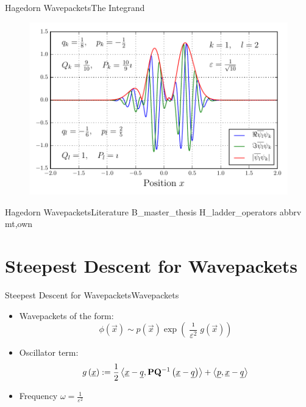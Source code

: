 \documentclass{beamer}
\begin{document}
\begin{frame}{Hagedorn Wavepackets}{The Integrand}
  \begin{figure}
    \centering
    \includegraphics[width=0.8\linewidth]{./fig/overlap_integrand.pdf}
  \end{figure}
\end{frame}


\begin{frame}{Hagedorn Wavepackets}{Literature}
  \nocite{hawp}{B_master_thesis}
  \nocite{hawp}{H_ladder_operators}
  \scriptsize
  {abbrv}
  {mt,own}{}
\end{frame}


\section{Steepest Descent for Wavepackets}


\begin{frame}{Steepest Descent for Wavepackets}{Wavepackets}
  \begin{itemize}
    \item Wavepackets of the form:
    \begin{equation*}
      \phi(\vec{x}) \sim p\left(\vec{x}\right)\exp\left(\frac{\imath}{\varepsilon^2} g\left(\vec{x}\right)\right)
    \end{equation*}
    \item Oscillator term:
    \begin{equation*}
      g\left(\underline{x}\right)
      :=
      \frac{1}{2} \left\langle \underline{x}-\underline{q} , \mathbf{P}\mathbf{Q}{}^{-1} \left(\underline{x}-\underline{q}\right) \right\rangle
      +
      \left\langle \underline{p} , \underline{x}-\underline{q} \right\rangle
    \end{equation*}
    \item Frequency $\omega = \frac{1}{\varepsilon^2}$
  \end{itemize}
\end{frame}
\end{document}
